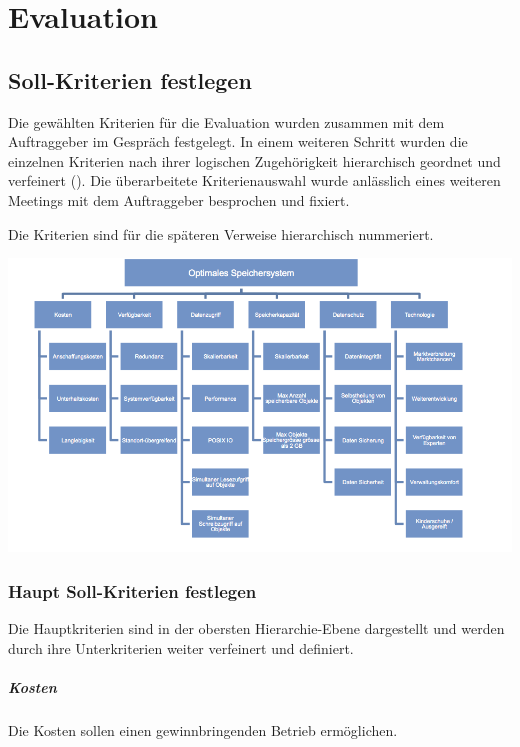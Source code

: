 \cleardoublepage
\chapter{Evaluation}

\section{Soll-Kriterien festlegen}
Die gewählten Kriterien für die Evaluation wurden zusammen mit dem Auftraggeber im Gespräch festgelegt. In einem weiteren Schritt wurden die einzelnen Kriterien nach ihrer logischen Zugehörigkeit hierarchisch geordnet und verfeinert (). Die überarbeitete Kriterienauswahl wurde anlässlich eines weiteren Meetings mit dem Auftraggeber besprochen und fixiert. 

Die Kriterien sind für die späteren Verweise hierarchisch nummeriert.

\begin{center}
\includegraphics[width=\linewidth, keepaspectratio = true]{media/ahp_kirterienbaum.png}
\end{center}

\subsection{Haupt Soll-Kriterien festlegen}
Die Hauptkriterien sind in der obersten Hierarchie-Ebene dargestellt und werden durch ihre Unterkriterien weiter verfeinert und definiert.
\setcounter{paragraph}{0}
\renewcommand\theparagraph{Soll-\arabic{paragraph}}
\paragraph{Kosten}\label{Soll-1}
Die Kosten sollen einen gewinnbringenden Betrieb ermöglichen. 

